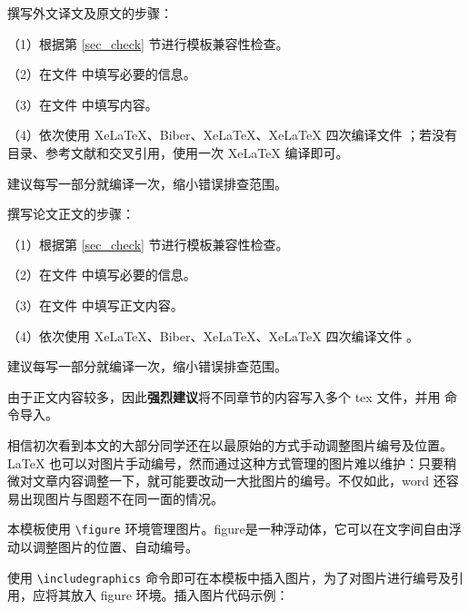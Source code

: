 
撰写外文译文及原文的步骤：

（1）根据第 \ref{sec_check} 节进行模板兼容性检查。

（2）在文件  中填写必要的信息。

（3）在文件  中填写内容。

（4）依次使用 XeLaTeX、Biber、XeLaTeX、XeLaTeX 四次编译文件 ；若没有目录、参考文献和交叉引用，使用一次 XeLaTeX 编译即可。

建议每写一部分就编译一次，缩小错误排查范围。



撰写论文正文的步骤：

（1）根据第 \ref{sec_check} 节进行模板兼容性检查。

（2）在文件  中填写必要的信息。

（3）在文件  中填写正文内容。

（4）依次使用 XeLaTeX、Biber、XeLaTeX、XeLaTeX 四次编译文件 。

建议每写一部分就编译一次，缩小错误排查范围。

由于正文内容较多，因此\textbf{强烈建议}将不同章节的内容写入多个 tex 文件，并用 \verb!! 命令导入。



相信初次看到本文的大部分同学还在以最原始的方式手动调整图片编号及位置。 \LaTeX{} 也可以对图片手动编号，然而通过这种方式管理的图片难以维护：只要稍微对文章内容调整一下，就可能要改动一大批图片的编号。不仅如此，word 还容易出现图片与图题不在同一面的情况。

本模板使用 \verb!\figure! 环境管理图片。figure是一种浮动体，它可以在文字间自由浮动以调整图片的位置、自动编号。

使用 \verb!\includegraphics! 命令即可在本模板中插入图片，为了对图片进行编号及引用，应将其放入 figure 环境。插入图片代码示例：

